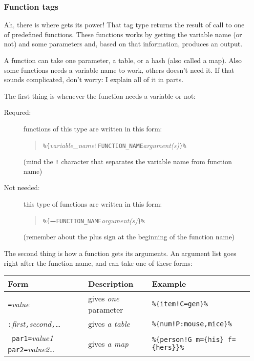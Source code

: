 \subsubsection{Function tags}
Ah, there is where \mulan{} gets its power! That tag type returns the result of call to one of predefined functions.
These functions works by getting the variable name (or not) and some parameters and, based on that information, produces an output. 

A function can take one parameter, a table, or a hash (also called a map). Also some functions needs a variable name to work, others doesn't need it.
If that sounds complicated, don't worry: I explain all of it in parts.

The first thing is whenever the function needs a variable or not:\begin{description}
	\item[Requred:] functions of this type are written in this form: \begin{quote}
		\verb+%{+\textit{variable\_name}\verb+!FUNCTION_NAME+\textit{argument(s)}\verb+}%+
	\end{quote} (mind the \texttt{!} character that separates the variable name from function name)
	\item[Not needed:] this type of functions are written in this form:\begin{quote}
		\verb+%{+\textbf{+}\verb+FUNCTION_NAME+\textit{argument(s)}\verb+}%+
	\end{quote} (remember about the plus sign at the beginning of the function name)
\end{description}

The second thing is how a function gets its arguments. An argument list goes right after the function name, and can take one of these forms:
\begin{center}
	\begin{tabular}{|l|l|l|} \hline 
		\bf Form & \bf Description & \bf Example \\ \hline 
		\verb+=+\textit{value} & gives \emph{one} parameter & \verb+%{item!C=gen}%+ \\ \hline 
		\verb+:+\textit{first}\verb+,+\textit{second}\verb+,+\ldots & gives \emph{a table} & \verb+%{num!P:mouse,mice}%+ \\ \hline 
		\verb*+ par1=+\textit{value1}\verb*+ par2=+\textit{value2}\ldots & gives \emph{a map} & \verb+%{person!G m={his} f={hers}}%+ \\ \hline 
	\end{tabular}
\end{center}

